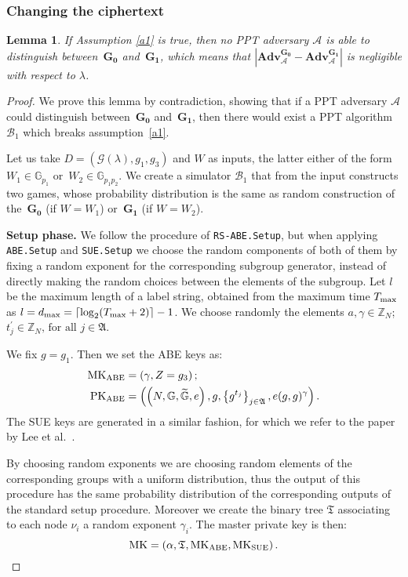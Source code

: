 \documentclass[a4paper,10pt]{article}
\newtheorem{lemma}{Lemma}
\newcommand{\G}{\mathbb{G}}
\newcommand{\GT}{\widetilde{\G}} \newcommand{\N}{\mathbb{N}}
\newcommand{\Z}{\mathbb{Z}}
\newcommand{\adv}{\textbf{Adv}}
\newcommand{\tree}{\mathfrak{T}}
\newcommand{\algorithm}[2]{\texttt{#1.#2}}
\newcommand{\randomchoose}[1]{We choose randomly the element\ifstrequal{#1}{s}{}{s} }
\newcommand{\game}[2]{$\mathbf{#1_{#2}}$}
\newcommand{\mathgame}[2]{\mathbf{#1_{#2}}}
\newcommand{\phase}[1]{\textbf{#1 phase.} \hspace{0pt}}
\newcommand{\disclaimerSUE}{The SUE keys are generated in a similar fashion, for which we refer to the paper by Lee et al.~\cite{lee2013RSABE}.

}
\begin{document}
	\subsubsection{Changing the ciphertext}
	\begin{lemma}
		\label{lemma.g0}
		If Assumption \ref{a1} is true, then no PPT adversary $\mathcal{A}$ is able to distinguish between~\game{G}{0} and~\game{G}{1}, which means that $\left| \adv_{\mathcal{A}}^{\mathgame{G}{0}} - \adv_{\mathcal{A}}^{\mathgame{G}{1}}\right|$ is negligible with respect to $\lambda$.
	\end{lemma}
	\begin{proof}
		We prove this lemma by contradiction, showing that if a PPT adversary $\mathcal{A}$ could distinguish between~\game{G}{0} and~\game{G}{1}, then there would exist a PPT algorithm $\mathscr{B}_1$ which breaks assumption~\ref{a1}.
	
	Let us take $D=\left(\mathscr{G}(\lambda),g_1,g_3\right)$ and $W$ as inputs, the latter either of the form~$W_1\in\G_{p_1}$ or~$W_2\in\G_{p_1p_2}$.
	We create a simulator $\mathscr{B}_1$ that from the input constructs two games, whose probability distribution is the same as random construction of the~\game{G}{0} (if $W=W_1$) or~\game{G}{1} (if $W=W_2$).
	
	\phase{Setup}
	We follow the procedure of \algorithm{RS-ABE}{Setup}, but when applying \algorithm{ABE}{Setup} and \algorithm{SUE}{Setup} we choose the random components of both of them by fixing a random exponent for the corresponding subgroup generator, instead of directly making the random choices between the elements of the subgroup.
	Let $l$ be the maximum length of a label string, obtained from the maximum time $T_\textnormal{max}$ as $l=d_\textnormal{max}=\left\lceil \log_2(T_\textnormal{max}+2) \right\rceil-1$.
	\randomchoose{p}{
$a,\gamma\in\Z_N$;
$t_j^\prime \in \Z_N\text{, for all }j\in \mathfrak{A}$.
	}
	
	
	We fix $g=g_1$. Then we set the ABE keys as:	
	\begin{align*}
		\mathrm{MK}_{\textnormal{ABE}}&=\left( \gamma, Z=g_3 \right);\\
\mathrm{PK}_{\textnormal{ABE}}&=\left( \left(N,\G,\GT,e\right), g, \left\{g^{t_j}\right\}_{j\in \mathfrak{A}}, e(g,g)^\gamma \right).
\end{align*}
	\disclaimerSUE{}
	By choosing random exponents we are choosing random elements of the corresponding groups with a uniform distribution, thus the output of this procedure has the same probability distribution of the corresponding outputs of the standard setup procedure.
	Moreover we create the binary tree $\tree$ associating to each node $\nu_i$ a random exponent $\gamma_{i}$.
	The master private key is then:
	\[
		\mathrm{MK}=\left(\alpha, \tree,  \mathrm{MK}_{\textnormal{ABE}}, \mathrm{MK}_{\textnormal{SUE}} \right).
	\]
	

\end{proof}
\end{document}
